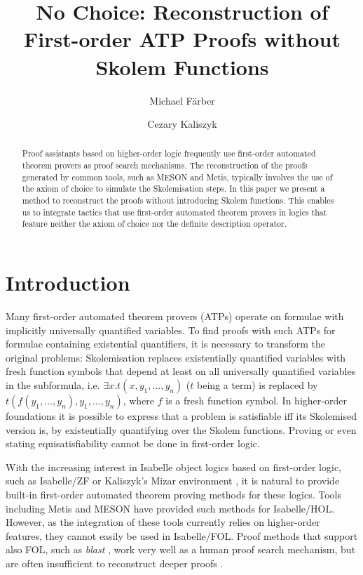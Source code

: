 \documentclass[]{article}
\title{No Choice: Reconstruction of First-order ATP Proofs without Skolem
Functions}
\author{Michael Färber \newparagraph \email{michael.faerber@uibk.ac.at} \and Cezary Kaliszyk \newparagraph \email{cezary.kaliszyk@uibk.ac.at}}
\date{}
\begin{document}
\maketitle
\begin{abstract}
Proof assistants based on higher-order logic frequently use first-order
automated theorem provers as proof search mechanisms. The reconstruction
of the proofs generated by common tools, such as MESON and Metis,
typically involves the use of the axiom of choice to simulate the
Skolemisation steps. In this paper we present a method to reconstruct
the proofs without introducing Skolem functions. This enables us to
integrate tactics that use first-order automated theorem provers in
logics that feature neither the axiom of choice nor the definite
description operator.
\end{abstract}

\section{Introduction}\label{introduction}

Many first-order automated theorem provers (ATPs) operate on formulae
with implicitly universally quantified variables. To find proofs with
such ATPs for formulae containing existential quantifiers, it is
necessary to transform the original problems: Skolemisation replaces
existentially quantified variables with fresh function symbols that
depend at least on all universally quantified variables in the
subformula, i.e. \(\exists x. t(x, y_1, \dots, y_n)\) (\(t\) being a
term) is replaced by \(t(f(y_1, \dots, y_n), y_1, \dots, y_n)\), where
\(f\) is a fresh function symbol. In higher-order foundations it is
possible to express that a problem is satisfiable iff its Skolemised
version is, by existentially quantifying over the Skolem functions.
Proving or even stating equisatisfiability cannot be done in first-order
logic.

With the increasing interest in Isabelle \citep{nipkow2002-isabelle}
object logics based on first-order logic, such as Isabelle/ZF
\citep{paulson1993-set} or Kaliszyk's Mizar environment
\citep{kaliszyk2016-misabelle}, it is natural to provide built-in
first-order automated theorem proving methods for these logics. Tools
including Metis \citep{hurd2003-metis} and MESON
\citep{harrison1996-meson} have provided such methods for Isabelle/HOL.
However, as the integration of these tools currently relies on
higher-order features, they cannot easily be used in Isabelle/FOL. Proof
methods that support also FOL, such as \emph{blast}
\citep{paulson1999-blast}, work very well as a human proof search
mechanism, but are often insufficient to reconstruct deeper proofs
\citep{blanchette2016-qed}.
\end{document}
